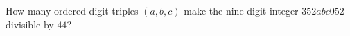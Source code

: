 How many ordered digit triples $(a,b,c)$ make the nine-digit integer $\overline{352abc052}$ divisible by $44$?
